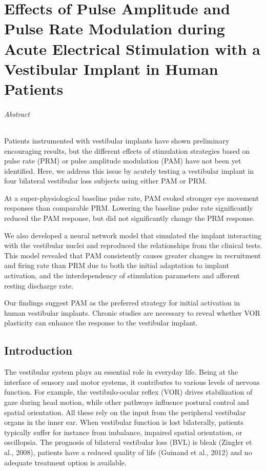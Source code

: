 \chapter{Effects of Pulse Amplitude and Pulse Rate Modulation during Acute Electrical Stimulation with a Vestibular Implant in Human Patients}\label{chap:pamprm}

\subparagraph{Abstract}
Patients instrumented with vestibular implants have shown preliminary encouraging results, but the different effects of stimulation strategies based on pulse rate (PRM) or pulse amplitude modulation (PAM) have not been yet identified. Here, we address this issue by acutely testing a vestibular implant in four bilateral vestibular loss subjects using either PAM or PRM. 

At a super-physiological baseline pulse rate, PAM evoked stronger eye movement responses than comparable PRM. Lowering the baseline pulse rate significantly reduced the PAM response, but did not significantly change the PRM response.

We also developed a neural network model that simulated the implant interacting with the vestibular nuclei and reproduced the relationships from the clinical tests. This model revealed that PAM consistently causes greater changes in recruitment and firing rate than PRM due to both the initial adaptation to implant activation, and the interdependency of stimulation parameters and afferent resting discharge rate. 

Our findings suggest PAM as the preferred strategy for initial activation in human vestibular implants. Chronic studies are necessary to reveal whether VOR plasticity can enhance the response to the vestibular implant. 

\section{Introduction}
The vestibular system plays an essential role in everyday life. Being at the interface of sensory and motor systems, it contributes to various levels of nervous function. For example, the vestibulo-ocular reflex (VOR) drives stabilization of gaze during head motion, while other pathways influence postural control and spatial orientation. All these rely on the input from the peripheral vestibular organs in the inner ear. When vestibular function is lost bilaterally, patients typically suffer for instance from imbalance, impaired spatial orientation, or oscillopsia. The prognosis of bilateral vestibular loss (BVL) is bleak (Zingler et al., 2008), patients have a reduced quality of life (Guinand et al., 2012) and no adequate treatment option is available.

